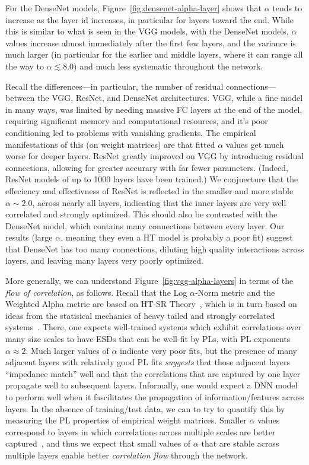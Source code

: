 For the DenseNet models, Figure~\ref{fig:densenet-alpha-layer} shows that $\alpha$ tends to increase as the layer id increases, in particular for layers toward the end.
While this is similar to what is seen in the VGG models, with the DenseNet models, $\alpha$ values increase almost immediately after the first few layers, and the variance is much larger (in particular for the earlier and middle layers, where it can range all the way to $\alpha\lesssim 8.0$) and much less systematic throughout the network.

Recall the differences---in particular, the number of residual connections---between the VGG, ResNet, and DenseNet architectures.
VGG, while a fine model in many ways, was limited by needing massive FC layers at the end of the model, requiring significant memory and computational resources, and it's poor conditioning led to problems with vanishing gradients.  
The empirical manifestations of this (on weight matrices) are that fitted $\alpha$ values get much worse for deeper layers.
ResNet greatly improved on VGG by introducing residual connections, allowing for greater accurary with far fewer parameters.
(Indeed, ResNet models of up to 1000 layers have been trained.) 
We conjuecture that the effeciency and effectivness of ResNet is reflected in the smaller and more stable $\alpha\sim 2.0$, across nearly all layers, indicating that the inner layers are very well correlated and strongly optimized.
This should also be contrasted with the DenseNet model, which contains many connections between every layer.
Our results (large $\alpha$, meaning they even a HT model is probably a poor fit) suggest that DenseNet has too many connections, diluting high quality interactions across layers, and leaving many layers very poorly optimized.

More generally, we can understand Figure~\ref{fig:vgg-alpha-layers} in terms of the \emph{flow of correlation}, as follows.
Recall that the Log $\alpha$-Norm metric and the Weighted Alpha metric are based on HT-SR Theory~\cite{MM18_TR, MM19_HTSR_ICML, MM20_SDM}, which is in turn based on ideas from the statisical mechanics of heavy tailed and strongly correlated systems~\cite{BouchaudPotters03, SornetteBook, BP11, bun2017}. 
There, one expects well-trained systems which exhibit correlations over many size scales to have ESDs that can be well-fit by PLs, with PL exponents $\alpha\approx 2$.
Much larger values of $\alpha$ indicate very poor fits, but the presence of many adjacent layers with relatively good PL fits \emph{suggests} that those adjacent layers ``impedance match'' well and that the correlations that are captured by one layer propagate well to subsequent layers.
Informally, one would expect a DNN model to perform well when it fascilitates the propagation of information/features across layers.
In the absence of training/test data, we can to try to quantify this by measuring the PL properties of empirical weight matrices.
Smaller $\alpha$ values correspond to layers in which correlations across multiple scales are better captured~\cite{MM18_TR,SornetteBook}, and thus we expect that small values of $\alpha$ that are stable across multiple layers enable better \emph{correlation flow} through the network.


